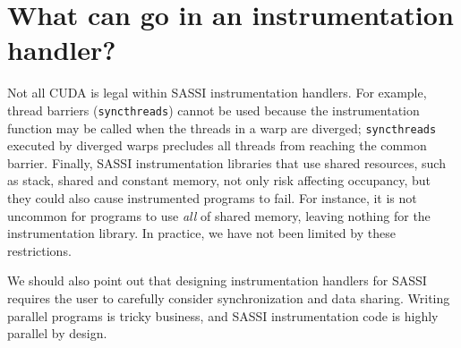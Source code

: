\section{What can go in an instrumentation handler?}
\label{sec:what-can-go}

Not all CUDA is legal within SASSI instrumentation handlers.  For example,
thread barriers (\texttt{syncthreads}) cannot be used because the
instrumentation function may be called when the threads in a warp are
diverged; {\tt syncthreads} executed by diverged warps precludes all
threads from reaching the common barrier.  Finally, SASSI
instrumentation libraries that use shared resources, such as stack, shared
and constant memory, not only risk affecting occupancy, but they could
also cause instrumented programs to fail. For instance, it is not
uncommon for programs to use \emph{all} of shared memory, leaving
nothing for the instrumentation library. In practice, we have not been
limited by these restrictions.

We should also point out that designing instrumentation handlers for
SASSI requires the user to carefully consider synchronization and data
sharing. Writing parallel programs is tricky business, and SASSI
instrumentation code is highly parallel by design.




